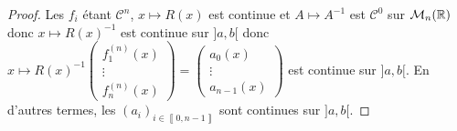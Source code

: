 \documentclass[12pt]{article}
\begin{document}
\begin{proof}
	Les $f_i$ étant $\mathcal{C}^{n}$, $x\mapsto R(x)$ est continue et $A\mapsto A^{-1}$ est $\mathcal{C}^{0}$ sur $\mathcal{M}_n(\mathbb{R})$ donc $x\mapsto R(x)^{-1}$ est continue sur $]a,b[$ donc $x\mapsto R(x)^{-1}\begin{pmatrix}
		f_1^{(n)}(x)\\\vdots\\f_{n}^{(n)}(x)
	\end{pmatrix}=\begin{pmatrix}
		a_0(x)\\\vdots\\a_{n-1}(x)
	\end{pmatrix}$ est continue sur $]a,b[$. En d'autres termes, les $(a_i)_{i\in\left\llbracket0,n-1\right\rrbracket}$ sont continues sur $]a,b[$.
\end{proof}
\end{document}
